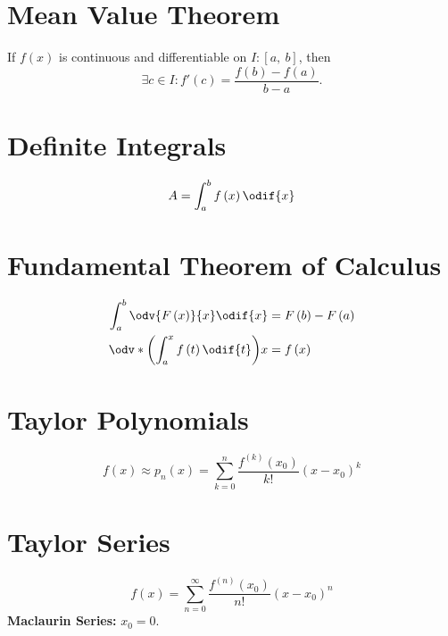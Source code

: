 \documentclass{article}
\begin{document}
\begin{multicols}{3}
    \section*{Mean Value Theorem}
    If \(f\left( x \right)\) is continuous and differentiable on \(I:\left[ a,\:b \right]\), then
    \begin{equation*}
        \exists c\in I:f'\left( c \right)=\frac{f\left( b \right)-f\left( a \right)}{b-a}.
    \end{equation*}
    \section*{Definite Integrals}
    \begin{equation*}
        A = \int_a^b f\left( x \right) \odif{x}
    \end{equation*}
    \section*{Fundamental Theorem of Calculus}
    \begin{align*}
        \int_a^b \odv{F\left( x \right)}{x} \odif{x} & = F\left( b \right) - F\left( a \right) \\
        \odv*{\left( \int_a^x f\left( t \right) \odif{t} \right)}{x} & = f\left( x \right)
    \end{align*}
    \section*{Taylor Polynomials}
    \begin{equation*}
        f\left( x \right) \approx p_n\left( x \right) = \sum_{k=0}^n \frac{f^{\left( k \right)}\left( x_0 \right)}{k!} \left( x-x_0 \right)^k
    \end{equation*}
    \section*{Taylor Series}
    \begin{equation*}
        f\left( x \right) = \sum_{n=0}^{\infty} \frac{f^{\left( n \right)}\left( x_0 \right)}{n!}\left( x-x_0 \right)^n
    \end{equation*}
    \textbf{Maclaurin Series:} \(x_0 = 0\).

\end{multicols}
\end{document}
